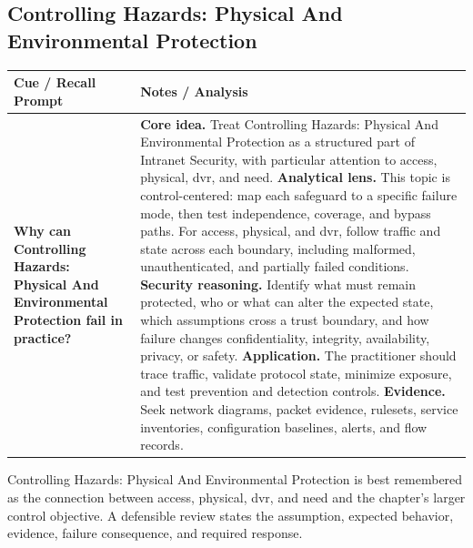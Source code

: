\documentclass[11pt]{article}
\newcommand{\CornellHeader}{%
\rowcolor{Navy}\color{white}\bfseries Cue / Recall Prompt & \color{white}\bfseries Notes / Analysis\\\hline}
\newcommand{\CornellRow}[2]{%
\cellcolor{CueGray}\RaggedRight\textbf{#1} & \RaggedRight #2\\\hline}
\begin{document}
\subsection*{Controlling Hazards: Physical And Environmental Protection}
\begin{longtable}{>{\RaggedRight\arraybackslash}p{}|>{\RaggedRight\arraybackslash}p{}}
\CornellHeader
\CornellRow{Why can Controlling Hazards: Physical And Environmental Protection fail in practice?}{\textbf{Core idea.} Treat Controlling Hazards: Physical And Environmental Protection as a structured part of Intranet Security, with particular attention to access, physical, dvr, and need. \textbf{Analytical lens.} This topic is control-centered: map each safeguard to a specific failure mode, then test independence, coverage, and bypass paths. For access, physical, and dvr, follow traffic and state across each boundary, including malformed, unauthenticated, and partially failed conditions. \textbf{Security reasoning.} Identify what must remain protected, who or what can alter the expected state, which assumptions cross a trust boundary, and how failure changes confidentiality, integrity, availability, privacy, or safety. \textbf{Application.} The practitioner should trace traffic, validate protocol state, minimize exposure, and test prevention and detection controls. \textbf{Evidence.} Seek network diagrams, packet evidence, rulesets, service inventories, configuration baselines, alerts, and flow records.}
\end{longtable}
\begin{topicsummary}
Controlling Hazards: Physical And Environmental Protection is best remembered as the connection between access, physical, dvr, and need and the chapter's larger control objective. A defensible review states the assumption, expected behavior, evidence, failure consequence, and required response.
\end{topicsummary}
\end{document}
